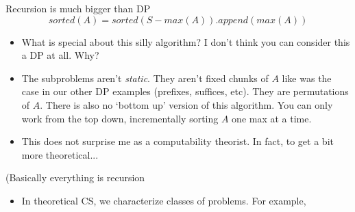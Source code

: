 \documentclass{beamer}
\begin{document}
\begin{frame}{Recursion is much bigger than DP}
    \[ sorted(A) = sorted(S-max(A)).append(max(A)) \]
    \begin{itemize}
        \item What is special about this silly algorithm? I don't think you can consider this a DP at all. Why? \pause 
        \item The subproblems aren't \emph{static}. They aren't fixed chunks of $A$ like was the case in our other DP examples (prefixes, suffices, etc). They are permutations of $A$. There is also no `bottom up' version of this algorithm. You can only work from the top down, incrementally sorting $A$ one max at a time. \pause 
        \item This does not surprise me as a computability theorist. In fact, to get a bit more theoretical...
    \end{itemize}
\end{frame}

\begin{frame}{(Basically everything is recursion}
    \begin{itemize}
        \item In theoretical CS, we characterize classes of problems. For example,
    \end{itemize}
\end{frame}
\end{document}
